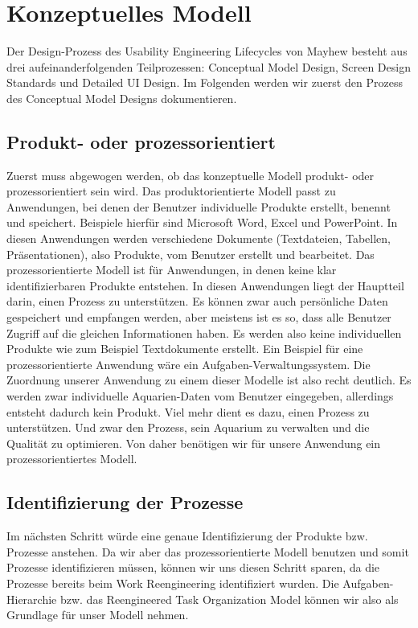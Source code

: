 \chapter{Konzeptuelles Modell}

Der Design-Prozess des Usability Engineering Lifecycles von Mayhew besteht aus drei aufeinanderfolgenden Teilprozessen: Conceptual Model Design, Screen Design Standards und Detailed UI Design. Im Folgenden werden wir zuerst den Prozess des Conceptual Model Designs dokumentieren.

\section{Produkt- oder prozessorientiert}

Zuerst muss abgewogen werden, ob das konzeptuelle Modell produkt- oder prozessorientiert sein wird. Das produktorientierte Modell passt zu Anwendungen, bei denen der Benutzer individuelle Produkte erstellt, benennt und speichert. Beispiele hierfür sind Microsoft Word, Excel und PowerPoint. In diesen Anwendungen werden verschiedene Dokumente (Textdateien, Tabellen, Präsentationen), also Produkte, vom Benutzer erstellt und bearbeitet. Das prozessorientierte Modell ist für Anwendungen, in denen keine klar identifizierbaren Produkte entstehen. In diesen Anwendungen liegt der Hauptteil darin, einen Prozess zu unterstützen. Es können zwar auch persönliche Daten gespeichert und empfangen werden, aber meistens ist es so, dass alle Benutzer Zugriff auf die gleichen Informationen haben. Es werden also keine individuellen Produkte wie zum Beispiel Textdokumente erstellt. Ein Beispiel für eine prozessorientierte Anwendung wäre ein Aufgaben-Verwaltungssystem. Die Zuordnung unserer Anwendung zu einem dieser Modelle ist also recht deutlich. Es werden zwar individuelle Aquarien-Daten vom Benutzer eingegeben, allerdings entsteht dadurch kein Produkt. Viel mehr dient es dazu, einen Prozess zu unterstützen. Und zwar den Prozess, sein Aquarium zu verwalten und die Qualität zu optimieren. Von daher benötigen wir für unsere Anwendung ein prozessorientiertes Modell. 

\section{Identifizierung der Prozesse}

Im nächsten Schritt würde eine genaue Identifizierung der Produkte bzw. Prozesse anstehen. Da wir aber das prozessorientierte Modell benutzen und somit Prozesse identifizieren müssen, können wir uns diesen Schritt sparen, da die Prozesse bereits beim Work Reengineering identifiziert wurden. Die Aufgaben-Hierarchie bzw. das Reengineered Task Organization Model können wir also als Grundlage für unser Modell nehmen.

